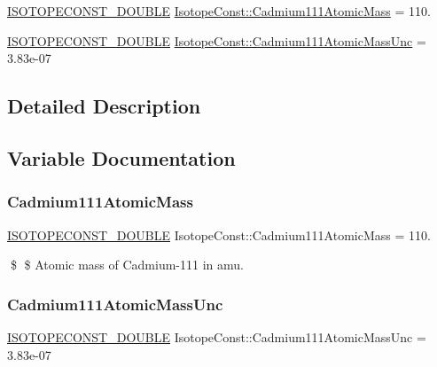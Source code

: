 \begin{DoxyCompactItemize}
\item 
\mbox{\hyperlink{group___isotope_const-_macros_ga8f45a7272ce02c0b4c65c44636ed719a}{I\+S\+O\+T\+O\+P\+E\+C\+O\+N\+S\+T\+\_\+\+D\+O\+U\+B\+LE}} \mbox{\hyperlink{group___isotope_const-_cadmium-_cd111_ga543c2f505e8a3f9e01c9287c161bd0bf}{Isotope\+Const\+::\+Cadmium111\+Atomic\+Mass}} = 110.
\item 
\mbox{\hyperlink{group___isotope_const-_macros_ga8f45a7272ce02c0b4c65c44636ed719a}{I\+S\+O\+T\+O\+P\+E\+C\+O\+N\+S\+T\+\_\+\+D\+O\+U\+B\+LE}} \mbox{\hyperlink{group___isotope_const-_cadmium-_cd111_ga76fe13fdf62ab63799eb9c433cc03f1c}{Isotope\+Const\+::\+Cadmium111\+Atomic\+Mass\+Unc}} = 3.\+83e-\/07
\end{DoxyCompactItemize}


\subsection{Detailed Description}


\subsection{Variable Documentation}
\mbox{\label{group___isotope_const-_cadmium-_cd111_ga543c2f505e8a3f9e01c9287c161bd0bf}} 
\subsubsection{\texorpdfstring{Cadmium111\+Atomic\+Mass}{Cadmium111AtomicMass}}
{\footnotesize\ttfamily \mbox{\hyperlink{group___isotope_const-_macros_ga8f45a7272ce02c0b4c65c44636ed719a}{I\+S\+O\+T\+O\+P\+E\+C\+O\+N\+S\+T\+\_\+\+D\+O\+U\+B\+LE}} Isotope\+Const\+::\+Cadmium111\+Atomic\+Mass = 110.}

\$ \$ Atomic mass of Cadmium-\/111 in amu. \mbox{\label{group___isotope_const-_cadmium-_cd111_ga76fe13fdf62ab63799eb9c433cc03f1c}} 
\subsubsection{\texorpdfstring{Cadmium111\+Atomic\+Mass\+Unc}{Cadmium111AtomicMassUnc}}
{\footnotesize\ttfamily \mbox{\hyperlink{group___isotope_const-_macros_ga8f45a7272ce02c0b4c65c44636ed719a}{I\+S\+O\+T\+O\+P\+E\+C\+O\+N\+S\+T\+\_\+\+D\+O\+U\+B\+LE}} Isotope\+Const\+::\+Cadmium111\+Atomic\+Mass\+Unc = 3.\+83e-\/07}

